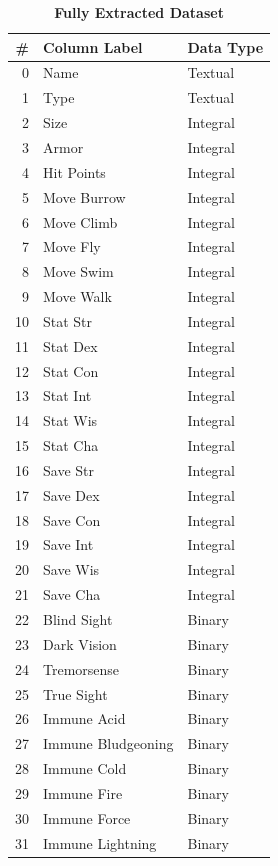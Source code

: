 \documentclass{article}
\begin{document}
\begin{table}[ht]
	\caption{\bfseries Fully Extracted Dataset}
	\label{tab:fully-extracted-dataset}
\begin{tiny}
\begin{minipage}[b]{0.45\linewidth}\centering
\begin{tabular}{@{}rll@{}}
	\toprule
	\# & Column Label & Data Type \\
	\midrule
	0 & Name & Textual \\
	1 & Type & Textual \\
	2 & Size & Integral \\
	3 & Armor & Integral \\
	4 & Hit Points & Integral \\
	5 & Move Burrow & Integral \\
	6 & Move Climb & Integral \\
	7 & Move Fly & Integral \\
	8 & Move Swim & Integral \\
	9 & Move Walk & Integral \\
	10 & Stat Str & Integral \\
	11 & Stat Dex & Integral \\
	12 & Stat Con & Integral \\
	13 & Stat Int & Integral \\
	14 & Stat Wis & Integral \\
	15 & Stat Cha & Integral \\
	16 & Save Str & Integral \\
	17 & Save Dex & Integral \\
	18 & Save Con & Integral \\
	19 & Save Int & Integral \\
	20 & Save Wis & Integral \\
	21 & Save Cha & Integral \\
	22 & Blind Sight & Binary \\
	23 & Dark Vision & Binary \\
	24 & Tremorsense & Binary \\
	25 & True Sight & Binary \\
	26 & Immune Acid & Binary \\
	27 & Immune Bludgeoning & Binary \\
	28 & Immune Cold & Binary \\
	29 & Immune Fire & Binary \\
	30 & Immune Force & Binary \\
	31 & Immune Lightning & Binary \\

\end{tabular}
\end{minipage}
\end{tiny}
\end{table}
\end{document}
